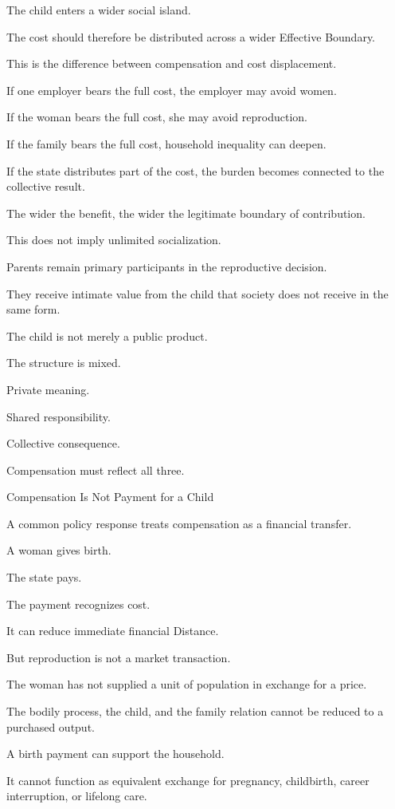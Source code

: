 The child enters a wider social island.

The cost should therefore be distributed across a wider Effective Boundary.

This is the difference between compensation and cost displacement.

If one employer bears the full cost, the employer may avoid women.

If the woman bears the full cost, she may avoid reproduction.

If the family bears the full cost, household inequality can deepen.

If the state distributes part of the cost, the burden becomes connected to the collective result.

The wider the benefit, the wider the legitimate boundary of contribution.

This does not imply unlimited socialization.

Parents remain primary participants in the reproductive decision.

They receive intimate value from the child that society does not receive in the same form.

The child is not merely a public product.

The structure is mixed.

Private meaning.

Shared responsibility.

Collective consequence.

Compensation must reflect all three.

Compensation Is Not Payment for a Child

A common policy response treats compensation as a financial transfer.

A woman gives birth.

The state pays.

The payment recognizes cost.

It can reduce immediate financial Distance.

But reproduction is not a market transaction.

The woman has not supplied a unit of population in exchange for a price.

The bodily process, the child, and the family relation cannot be reduced to a purchased output.

A birth payment can support the household.

It cannot function as equivalent exchange for pregnancy, childbirth, career interruption, or lifelong care.

